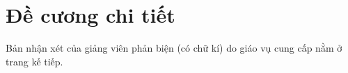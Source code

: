 \chapter*{Đề cương chi tiết}
\label{thanks}

Bản nhận xét của giảng viên phản biện (có chữ kí) do giáo vụ cung cấp nằm ở trang kế tiếp.